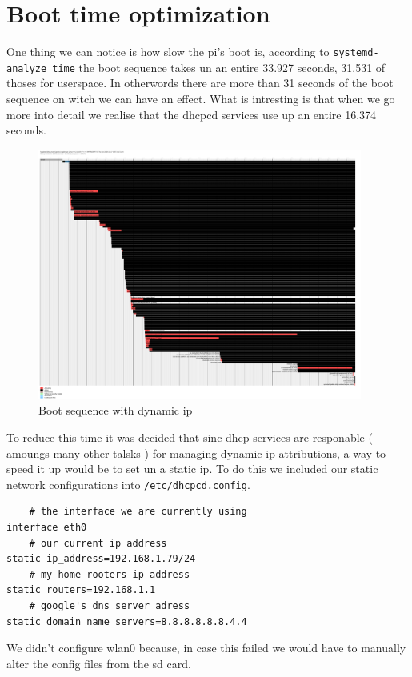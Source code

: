 \documentclass[a4paper,oneside,onecolumn]{article}
\newcommand{\code}[1]{\colorbox{codegray}{\texttt{#1}}}
\begin{document}
\section{Boot time optimization}

One thing we can notice is how slow the pi's boot is, according to \code{systemd-analyze time} the boot sequence takes un an entire 33.927 seconds, 31.531 of thoses for userspace. In otherwords there are more than 31 seconds of the boot sequence on witch we can have an effect. What is intresting is that when we go more into detail we realise that the dhcpcd services use up an entire 16.374 seconds.
\begin{figure}[htbp]
	\centering
	\includegraphics[width=0.95\textwidth]{resources/bootdyn.png}
	\caption{Boot sequence with dynamic ip}
	\label{fig:label}
\end{figure}
To reduce this time it was decided that sinc dhcp services are responable ( amoungs many other talsks ) for managing dynamic ip attributions, a way to speed it up would be to set un a static ip.\newline
To do this we included our static network configurations into \code{/etc/dhcpcd.config}.
\begin{lstlisting}
	# the interface we are currently using
interface eth0
	# our current ip address
static ip_address=192.168.1.79/24
	# my home rooters ip address
static routers=192.168.1.1
	# google's dns server adress
static domain_name_servers=8.8.8.8.8.8.4.4
\end{lstlisting}
We didn't configure wlan0 because, in case this failed we would have to manually alter the config files from the sd card.\newline
\end{document}
